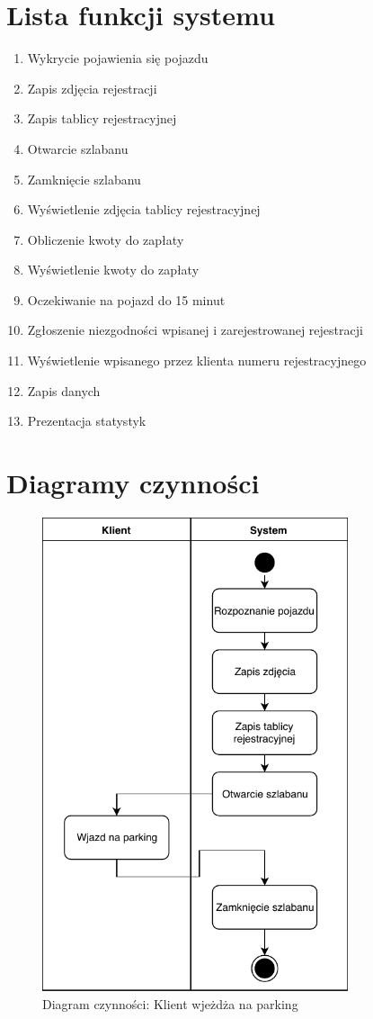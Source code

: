 \section{Lista funkcji systemu}


\begin{enumerate}
	\item Wykrycie pojawienia się pojazdu
	\item Zapis zdjęcia rejestracji
	\item Zapis tablicy rejestracyjnej
	\item Otwarcie szlabanu
	\item Zamknięcie szlabanu
	\item Wyświetlenie zdjęcia tablicy rejestracyjnej
	\item Obliczenie kwoty do zapłaty
	\item Wyświetlenie kwoty do zapłaty
	\item Oczekiwanie na pojazd do 15 minut
	\item Zgłoszenie niezgodności wpisanej i zarejestrowanej rejestracji
	\item Wyświetlenie wpisanego przez klienta numeru rejestracyjnego
	\item Zapis danych
	\item Prezentacja statystyk
\end{enumerate}

\section{Diagramy czynności}

\begin{figure}[H]
	\centering
	\includegraphics[width=90mm]{diagramy/DiagCzynWjazd.pdf}
	\caption{Diagram czynności: Klient wjeżdża na parking \label{overflow}}
\end{figure}


